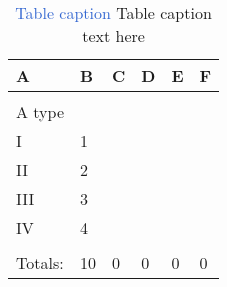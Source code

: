 \begin{table}
\caption{\textcolor{Highlight}{Table caption} Table caption text here}
\centering
\begin{small}
\begin{tabular}{p{}M{0.1\textwidth}M{0.15\textwidth}M{0.1\textwidth}M{0.1\textwidth}M{0.125\textwidth}}

\toprule

\textbf{A}  & \textbf{B} & \textbf{C} & \textbf{D} & \textbf{E} & \textbf{F} \\
\midrule
        &     &    &    &    &    \\
A type  &     &    &    &    &    \\
\midrule
I       & 1  &    &    &    &    \\
II      & 2  &    &    &    &    \\
III     & 3  &    &    &    &    \\
IV      & 4  &    &    &    &    \\
 &     &    &    &    &    \\
Totals:   & 10 & 0 & 0 & 0 & 0\\
\bottomrule
\end{tabular}
\end{small}
\label{tab:1}
\end{table}
